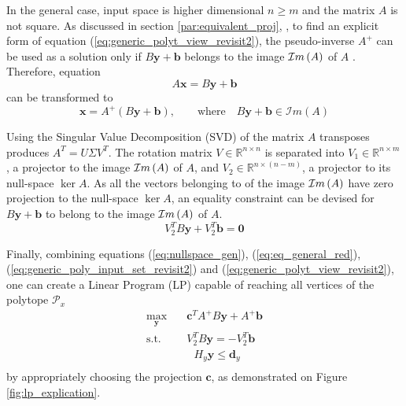 In the general case, input space is higher dimensional $n\geq m$ and the matrix $A$ is not square. As discussed in section \ref{par:equivalent_proj}, , to find an explicit form of equation (\ref{eq:generic_polyt_view_revisit2}), the pseudo-inverse $A^+$ can be used as a solution only if $B\bm{y}+\bm{b}$ belongs to the image $\mathcal{I}m\left(A\right)$ of $A$ \cite{klema_singular_1980}. Therefore, equation 
\begin{equation}
    A\bm{x} = B\bm{y} + \bm{b}
\end{equation} 
can be transformed to 
\begin{equation}
    \bm{x} = A^{+} (B \bm{y} + \bm{b}), \qquad \text{where} \quad B\bm{y} + \bm{b} \in \mathcal{I}m(A)
    \label{eq:eq_general_red}
\end{equation} 

Using the Singular Value Decomposition (SVD) \cite{klema_singular_1980} of the matrix $A$ transposes produces $A^T = U\Sigma V^T$. The rotation matrix $V \in \mathbb{R}^{n\times n }$ is separated into  $V_1\in \mathbb{R}^{n\times m}$, a projector to the image $\mathcal{I}m\left(A\right)$ of $A$, and $V_2\in \mathbb{R}^{n\times(n-m)}$, a projector to its null-space $\ker{A}$. As all the vectors belonging to of the image $\mathcal{I}m\left(A\right)$ have zero projection to the null-space $\ker{A}$, an equality constraint can be devised for $B\bm{y}+\bm{b}$ to belong to the image $\mathcal{I}m\left(A\right)$ of $A$. 
\begin{equation}
    V_2^TB\bm{y} +V_2^T\bm{b}  = \bm{0}
    \label{eq:nullspace_gen}
\end{equation}

Finally, combining equations (\ref{eq:nullspace_gen}), (\ref{eq:eq_general_red}), (\ref{eq:generic_poly_input_set_revisit2}) and (\ref{eq:generic_polyt_view_revisit2}), one can create a Linear Program (LP) capable of reaching all vertices of the polytope $\mathcal{P}_x$
\begin{equation}
\begin{aligned}
    \max_{\bm{y}} \quad &  \bm{c}^TA^{+}B\bm{y} + A^{+}\bm{b}\\
     \textrm{s.t.} \quad &  V_2^TB\bm{y} = -V_2^T\bm{b} \\
          & ~~~  H_y \bm{y} \leq \bm{d}_y \\
\end{aligned}
\label{eq:lin_prog}
\end{equation}
by appropriately choosing the projection $\bm{c}$, as demonstrated on Figure \ref{fig:lp_explication}.



